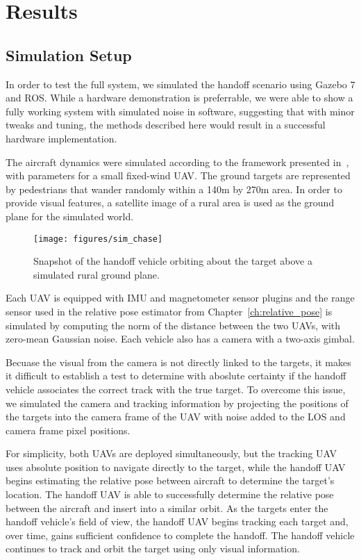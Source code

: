 \chapter{Results}
\label{ch:results}


\section{Simulation Setup}
In order to test the full system, we simulated the handoff scenario using Gazebo 7 and ROS. While a hardware demonstration is preferrable, we were able to show a fully working system with simulated noise in software, suggesting that with minor tweaks and tuning, the methods described here would result in a successful hardware implementation.

The aircraft dynamics were simulated according to the framework presented in~\cite{BeardMcLain12}, with parameters for a small fixed-wind UAV. The ground targets are represented by pedestrians that wander randomly within a 140m by 270m area. In order to provide visual features, a satellite image of a rural area is used as the ground plane for the simulated world.

\begin{figure}[hbt]
  \centering
  \texttt{[image: figures/sim\_chase]}
  \caption{Snapshot of the handoff vehicle orbiting about the target above a simulated rural ground plane.}
  \label{fig:sim_chase}
\end{figure}

Each UAV is equipped with IMU and magnetometer sensor plugins and the range sensor used in the relative pose estimator from Chapter~\ref{ch:relative_pose} is simulated by computing the norm of the distance between the two UAVs, with zero-mean Gaussian noise.
Each vehicle also has a camera with a two-axis gimbal.

Becuase the visual from the camera is not directly linked to the targets, it makes it difficult to establish a test to determine with aboslute certainty if the handoff vehicle associates the correct track with the true target.
To overcome this issue, we simulated the camera and tracking information by projecting the positions of the targets into the camera frame of the UAV with noise added to the LOS and camera frame pixel positions.

For simplicity, both UAVs are deployed simultaneously, but the tracking UAV uses absolute position to navigate directly to the target, while the handoff UAV begins estimating the relative pose between aircraft to determine the target's location.
The handoff UAV is able to successfully determine the relative pose between the aircraft and insert into a similar orbit.
As the targets enter the handoff vehicle's field of view, the handoff UAV begins tracking each target and, over time, gains sufficient confidence to complete the handoff.
The handoff vehicle continues to track and orbit the target using only visual information.

